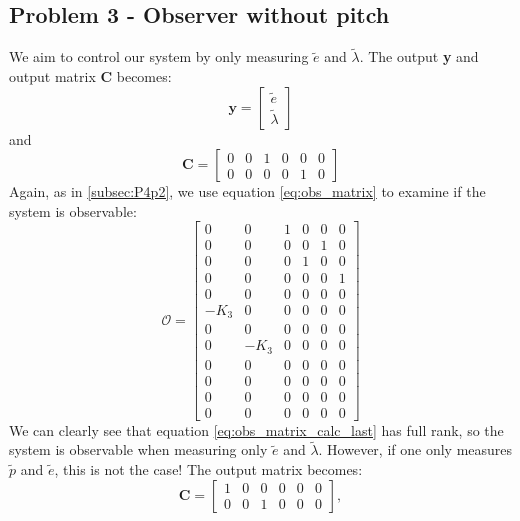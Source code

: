 \subsection{Problem 3 - Observer without pitch}\label{subsec:P4p3}
We aim to control our system by only measuring $\tilde{e}$ and $\tilde{\lambda}$. The output \textbf{y} and output matrix \textbf{C} becomes:
\begin{equation}\label{eq:y_P4p3}
\mathbf{y} = 
\begin{bmatrix}
\tilde{e}\\
\tilde{\lambda}
\end{bmatrix}
\end{equation}
and
\begin{equation}\label{eq:C_P4p3}
\mathbf{C} = 
    \begin{bmatrix}
    0 & 0 & 1 & 0 & 0 & 0 \\
    0 & 0 & 0 & 0 & 1 & 0 
    \end{bmatrix}
\end{equation}
Again, as in \ref{subsec:P4p2}, we use equation \eqref{eq:obs_matrix} to examine if the system is observable:
\begin{equation}\label{eq:obs_matrix_calc_last}
    \mathcal {O}=
    {\begin{bmatrix}
        0 & 0 & 1 & 0 & 0 & 0\\
        0 & 0 & 0 & 0 & 1 & 0\\
        0 & 0 & 0 & 1 & 0 & 0\\
        0 & 0 & 0 & 0 & 0 & 1\\
        0 & 0 & 0 & 0 & 0 & 0\\
        -K_3 & 0 & 0 & 0 & 0 & 0\\
        0 & 0 & 0 & 0 & 0 & 0\\
        0 & -K_3 & 0 & 0 & 0 & 0\\
        0 & 0 & 0 & 0 & 0 & 0\\
        0 & 0 & 0 & 0 & 0 & 0\\
        0 & 0 & 0 & 0 & 0 & 0\\
        0 & 0 & 0 & 0 & 0 & 0
    \end{bmatrix}}
\end{equation}
We can clearly see that equation \eqref{eq:obs_matrix_calc_last} has full rank, so the system is observable when measuring only $\tilde{e}$ and $\tilde{\lambda}$. However, if one only measures $\tilde{p}$ and $\tilde{e}$, this is not the case! The output matrix becomes:
\begin{equation}\nonumber
\mathbf{C} = 
    \begin{bmatrix}
    1 & 0 & 0 & 0 & 0 & 0 \\
    0 & 0 & 1 & 0 & 0 & 0 
    \end{bmatrix},
\end{equation}

